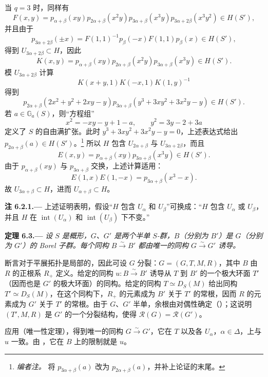 当 \(q=3\) 时，同样有
\[
 F(x,y)=
 p_{\alpha+\beta}(xy)
 p_{2\alpha+\beta}(x^2y)
 p_{3\alpha+\beta}(x^3y)
 p_{3\alpha+2\beta}(x^3y^2)\in H(S'),
\]
并且由于
\[
 p_{3\alpha+2\beta}(\pm x)
 =F(1,1)^{-1}p_\beta(-x)F(1,1)p_\beta(x)\in H(S'),
\]
得到 \(U_{3\alpha+2\beta}\subset H\)，因此
\[
 K(x,y)=
 p_{\alpha+\beta}(xy)
 p_{2\alpha+\beta}(x^2y)
 p_{3\alpha+\beta}(x^3y)\in H(S').
\]
模 \(U_{3\alpha+2\beta}\) 计算
\[
 K(x+y,1)K(-x,1)K(1,y)^{-1}
\]
得到
\[
 p_{2\alpha+\beta}(2x^2+y^2+2xy-y)
 p_{3\alpha+\beta}(y^3+3xy^2+3x^2y-y)\in H(S').
\]
若 \(a\in\mathbb G_a(S)\)，则“方程组”
\[
  x^2=-xy-y+1-a,\qquad
  y^2=3y-2+3a
\]
定义了 \(S\) 的自由满扩张。此时 \(y^3+3xy^2+3x^2y-y=0\)，上述表达式给出 \(p_{2\alpha+\beta}(a)\in H(S')\)。\footnote{\textit{编者注。} 将 \(p_{3\alpha+\beta}(a)\) 改为 \(p_{2\alpha+\beta}(a)\)，并补上论证的末尾。}
所以 \(H\) 包含 \(U_{2\alpha+\beta}\) 与 \(U_{3\alpha+2\beta}\)，而且
\[
 E(x,y)=p_{\alpha+\beta}(xy)p_{3\alpha+\beta}(x^3y)\in H(S').
\]
由于 \(p_{\alpha+\beta}(xy)\) 与 \(p_{3\alpha+\beta}\) 交换，上述计算适用：
\[
 E(1,x)E(1,-x)=p_{3\alpha+\beta}(x^3-x).
\]
故 \(U_{3\alpha+\beta}\subset H\)，进而 \(U_{\alpha+\beta}\subset H\)。

\par\medskip\noindent{}\textbf{注 6.2.1.---}\enspace
上述证明表明，假设“\(H\) 包含 \(U_\alpha\) 和 \(U_\beta\)”可换成：“\(H\) 包含 \(U_\alpha\) 或 \(U_\beta\)，并且 \(H\) 在 \(\operatorname{int}(U_\alpha)\) 和 \(\operatorname{int}(U_\beta)\) 下不变。”

\par\medskip\noindent{}\textbf{定理 6.3.---}\enspace
\emph{设 \(S\) 是概形，\(G\)、\(G'\) 是两个半单 \(S\)-群，\(B\)（分别为 \(B'\)）是 \(G\)（分别为 \(G'\)）的 Borel 子群。每个同构 \(B\xrightarrow{\sim}B'\) 都由唯一的同构 \(G\xrightarrow{\sim}G'\) 诱导。}

断言对于平展拓扑是局部的，因此可设 \(G\) 分裂：\(G=(G,T,M,R)\)，其中 \(B\) 由 \(R\) 的正根系 \(R_+\) 定义。给定的同构 \(u:B\xrightarrow{\sim}B'\) 诱导从 \(T\) 到 \(B'\) 的一个极大环面 \(T'\)（因而也是 \(G'\) 的极大环面）的同构。给定的同构 \(T\simeq D_S(M)\) 给出同构 \(T'\simeq D_S(M)\)，在这个同构下，\(R_+\) 的元素成为 \(B'\) 关于 \(T'\) 的常根，因而 \(R\) 的元素成为 \(G'\) 关于 \(T'\) 的常根。由于 \(G\)、\(G'\) 半单，余根由对偶性确定（）；这说明 \((T',M,R)\) 是 \(G'\) 的一个分裂结构，使得 \(\mathscr R(G)=\mathscr R(G')\)。

应用（唯一性定理），得到唯一的同构 \(G\xrightarrow{\sim}G'\)，它在 \(T\) 以及各 \(U_\alpha\)，\(\alpha\in\Delta\)，上与 \(u\) 一致。由 ，它在 \(B\) 上的限制就是 \(u\)。


